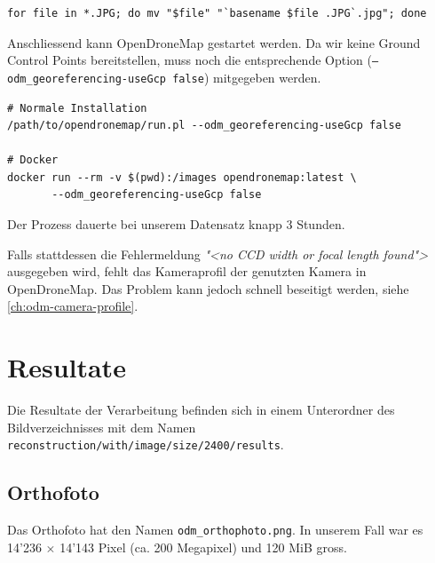 \vspace{0.5\baselineskip}
\begin{verbatim} 
for file in *.JPG; do mv "$file" "`basename $file .JPG`.jpg"; done
\end{verbatim}

Anschliessend kann OpenDroneMap gestartet werden. Da wir keine Ground Control
Points bereitstellen, muss noch die entsprechende Option
(\texttt{---odm\_georeferencing-useGcp false}) mitgegeben werden.

\vspace{0.5\baselineskip}
\begin{verbatim} 
# Normale Installation
/path/to/opendronemap/run.pl --odm_georeferencing-useGcp false

# Docker
docker run --rm -v $(pwd):/images opendronemap:latest \
       --odm_georeferencing-useGcp false
\end{verbatim}

\noindent Der Prozess dauerte bei unserem Datensatz knapp 3 Stunden.

Falls stattdessen die Fehlermeldung \textit{"<no CCD width or focal length
found">} ausgegeben wird, fehlt das Kameraprofil der genutzten Kamera in
OpenDroneMap.  Das Problem kann jedoch schnell beseitigt werden, siehe
\autoref{ch:odm-camera-profile}.


\section{Resultate}

Die Resultate der Verarbeitung befinden sich in einem Unterordner des
Bildverzeichnisses mit dem Namen
\texttt{reconstruction\-/with\-/image\-/size\-/2400\-/results}.

\subsection{Orthofoto}

Das Orthofoto hat den Namen \texttt{odm\_orthophoto.png}. In unserem Fall war es
14'236 $\times$ 14'143 Pixel (ca. 200 Megapixel) und 120 MiB gross.

